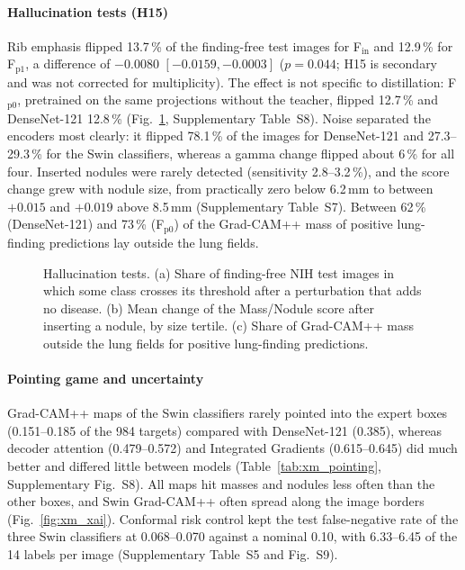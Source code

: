 \paragraph{Hallucination tests (H15)} Rib emphasis flipped 13.7\,\% of the finding-free test images for F$_\mathrm{in}$ and 12.9\,\% for
F$_\mathrm{p1}$, a difference of $-0.0080$ $[-0.0159, -0.0003]$ ($p=0.044$; H15 is secondary and was not corrected for multiplicity). The
effect is not specific to distillation: F$_\mathrm{p0}$, pretrained on the same projections without the teacher, flipped 12.7\,\% and
DenseNet-121 12.8\,\% (Fig.~\ref{fig:xm_halluc}, Supplementary Table~S8). Noise separated the encoders most clearly: it flipped 78.1\,\% of
the images for DenseNet-121 and 27.3--29.3\,\% for the Swin classifiers, whereas a gamma change flipped about 6\,\% for all four. Inserted
nodules were rarely detected (sensitivity 2.8--3.2\,\%), and the score change grew with nodule size, from practically zero below 6.2\,mm to
between $+0.015$ and $+0.019$ above 8.5\,mm (Supplementary Table~S7). Between 62\,\% (DenseNet-121) and 73\,\% (F$_\mathrm{p0}$) of the Grad-CAM++ mass of positive
lung-finding predictions lay outside the lung fields.

\begin{figure}[htbp]
\centering
{}
\caption{Hallucination tests. (a) Share of finding-free NIH test images in which some class crosses its threshold after a perturbation that
adds no disease. (b) Mean change of the Mass/Nodule score after inserting a nodule, by size tertile. (c) Share of Grad-CAM++ mass outside
the lung fields for positive lung-finding predictions.}
\label{fig:xm_halluc}
\end{figure}

\paragraph{Pointing game and uncertainty} Grad-CAM++ maps of the Swin classifiers rarely pointed into the expert boxes (0.151--0.185 of the
984 targets) compared with DenseNet-121 (0.385), whereas decoder attention (0.479--0.572) and Integrated Gradients (0.615--0.645) did much
better and differed little between models (Table~\ref{tab:xm_pointing}, Supplementary Fig.~S8). All maps hit masses and nodules less often than the other boxes,
and Swin Grad-CAM++ often spread along the image borders (Fig.~\ref{fig:xm_xai}). Conformal risk control kept the test false-negative rate
of the three Swin classifiers at 0.068--0.070 against a nominal 0.10, with 6.33--6.45 of the 14 labels per image
(Supplementary Table~S5 and Fig.~S9).

